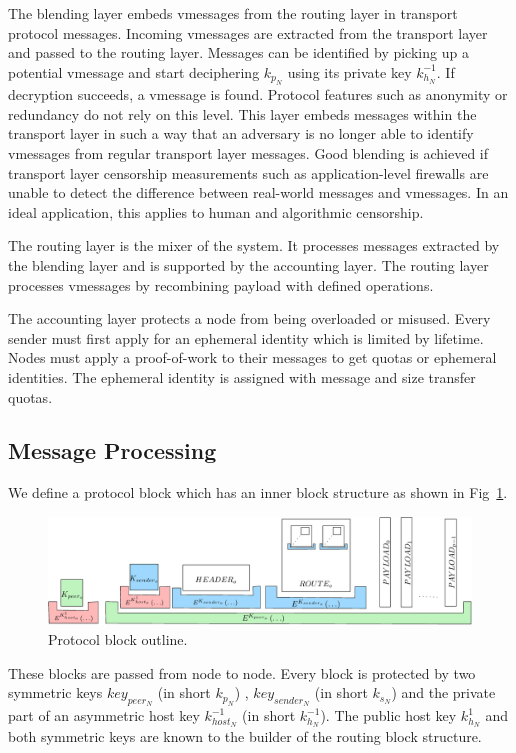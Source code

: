 \documentclass[runningheads]{llncs}
\begin{document}
The blending layer embeds vmessages from the routing layer in transport protocol messages. Incoming vmessages are extracted from the transport layer and passed to the routing layer. Messages can be identified by picking up a potential vmessage and start deciphering $k_{p_N}$ using its private key $k^{-1}_{h_N}$. If decryption succeeds, a vmessage is found. Protocol features such as anonymity or redundancy do not rely on this level. This layer embeds messages within the transport layer in such a way that an adversary is no longer able to identify vmessages from regular transport layer messages. Good blending is achieved if transport layer censorship measurements such as application-level firewalls are unable to detect the difference between real-world messages and vmessages. In an ideal application, this applies to human  and algorithmic censorship. 

The routing layer is the mixer of the system. It processes messages extracted by the blending layer and is supported by the accounting layer. The routing layer processes vmessages by recombining payload with defined operations. 

The accounting layer protects a node from being overloaded or misused. Every sender must first apply for an ephemeral identity which is limited by lifetime. Nodes must apply a proof-of-work to their messages to get quotas or ephemeral identities. The ephemeral identity is assigned with message and size transfer quotas. 

\subsection{Message Processing}
We define a protocol block which has an inner block structure as shown in Fig~\ref{fig:blocks}.

\begin{figure}[htb]
	\centering
	\includegraphics[width=0.8\columnwidth]{../../inc/blockLayoutSimplified}
	\caption{Protocol block outline.}
	\label{fig:blocks}
\end{figure}

These blocks are passed from node to node. Every block is protected by two symmetric keys $key_{peer_N}$ (in short $k_{p_N}$) , $key_{sender_N}$ (in short $k_{s_N}$) and the private part of an asymmetric host key $k^{-1}_{host_N}$ (in short $k^{-1}_{h_N}$). The public host key $k^{1}_{h_N}$ and both symmetric keys are known to the builder of the routing block structure. 
\end{document}

